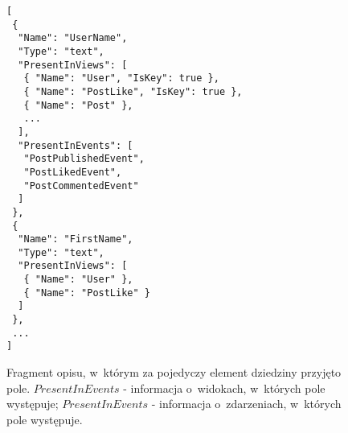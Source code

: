 \begin{figure}[!ht]
\begin{verbatim}
[
 {
  "Name": "UserName",
  "Type": "text",
  "PresentInViews": [
   { "Name": "User", "IsKey": true },
   { "Name": "PostLike", "IsKey": true },
   { "Name": "Post" },
   ...
  ],
  "PresentInEvents": [
   "PostPublishedEvent",
   "PostLikedEvent",
   "PostCommentedEvent"
  ]
 },
 {
  "Name": "FirstName",
  "Type": "text",
  "PresentInViews": [
   { "Name": "User" },
   { "Name": "PostLike" }
  ]
 },
 ...
]
\end{verbatim}
\caption{
 Fragment opisu, w~którym za pojedyczy element dziedziny przyjęto pole.
 $PresentInEvents$ - informacja o~widokach, w~których pole występuje; $PresentInEvents$ - informacja o~zdarzeniach, w~których pole występuje.
}
\label{fig:single:model_perField}
\end{figure}
